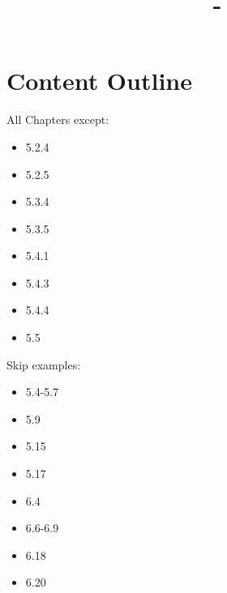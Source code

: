 \documentclass[answers,12pt,addpoints]{exam}
\author{\name}
\title{\course \ - \assignment}
\begin{document}
\maketitle

\newpage
\section*{Content Outline}
All Chapters except:
\begin{itemize}
    \item 5.2.4
    \item 5.2.5
    \item 5.3.4
    \item 5.3.5
    \item 5.4.1
    \item 5.4.3
    \item 5.4.4
    \item 5.5
\end{itemize}
Skip examples:
\begin{itemize}
    \item 5.4-5.7
    \item 5.9
    \item 5.15
    \item 5.17
    \item 6.4
    \item 6.6-6.9
    \item 6.18
    \item 6.20
\end{itemize}
\end{document}
